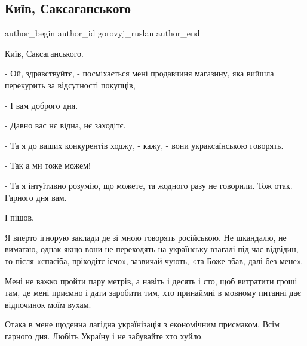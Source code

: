  
 
 
 
 
 
\subsection{Київ, Саксаганського}
\label{sec:09_01_2022.fb.gorovyj_ruslan.1.kiev_saksaganskogo}
 
\ifcmt
 author_begin
   author_id gorovyj_ruslan
 author_end
\fi

Київ, Саксаганського.

- Ой, здравствуйтє, - посміхається мені продавчиня магазину, яка вийшла
перекурить за відсутності покупців, 

- І вам доброго дня.

- Давно вас нє відна, нє заходітє.

- Та я до ваших конкурентів ходжу,  - кажу, - вони украксаїнською говорять.

- Так а ми тоже можем!

- Та я інтуїтивно розумію, що можете, та жодного разу не говорили. Тож отак.
Гарного дня вам. 

І пішов.

Я вперто ігнорую заклади де зі мною говорять російською. Не шкандалю, не
вимагаю, однак якщо вони не переходять на українську взагалі під час відвідин,
то після «спасіба, пріходітє ісчо», зазвичай чують, «та Боже збав, далі без
мене». 

Мені не важко пройти пару метрів, а навіть і десять і сто, щоб витратити гроші
там, де мені приємно і дати заробити тим, хто принаймні в мовному питанні дає
відпочинок моїм вухам.

Отака в мене щоденна лагідна українізація з економічним присмаком. Всім гарного
дня. Любіть Україну і не забувайте хто хуйло.

